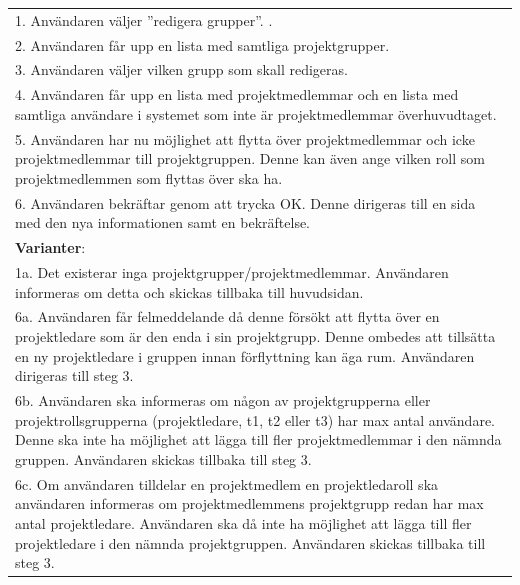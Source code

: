 \documentclass[a4paper]{article}
\begin{document}
\begin{table}[H]
\begin{tabular}{ | p{2cm} p{11cm} | }
	\multicolumn{2}{|p{13cm}|}{1. Användaren väljer ''redigera grupper''. .}\\
	\multicolumn{2}{|p{13cm}|}{2. Användaren får upp en lista med samtliga projektgrupper.}\\
	\multicolumn{2}{|p{13cm}|}{3. Användaren väljer vilken grupp som skall redigeras.} \\	
	\multicolumn{2}{|p{13cm}|}{4. Användaren får upp en lista med projektmedlemmar och en lista med samtliga användare i systemet som inte är projektmedlemmar överhuvudtaget.} \\	
	\multicolumn{2}{|p{13cm}|}{5. Användaren har nu möjlighet att flytta över projektmedlemmar och icke projektmedlemmar till projektgruppen. Denne kan även ange vilken roll som projektmedlemmen som flyttas över ska ha.} \\	
	\multicolumn{2}{|p{13cm}|}{6. Användaren bekräftar genom att trycka OK. Denne dirigeras till en sida med den nya informationen samt en bekräftelse.} \\
	\hline
    \multicolumn{2}{|p{13cm}|}{\textbf{Varianter}: }\\
    \multicolumn{2}{|p{13cm}|}{1a. Det existerar inga projektgrupper/projektmedlemmar. Användaren informeras om detta och skickas tillbaka till huvudsidan.}\\
    \multicolumn{2}{|p{13cm}|}{6a. Användaren får felmeddelande då denne försökt att flytta över en projektledare som är den enda i sin projektgrupp. Denne ombedes att tillsätta en ny projektledare i gruppen innan förflyttning kan äga rum. Användaren dirigeras till steg 3.} \\
    \multicolumn{2}{|p{13cm}|}{6b. Användaren ska informeras om någon av projektgrupperna eller projektrollsgrupperna (projektledare, t1, t2 eller t3) har max antal användare. Denne ska inte ha möjlighet att lägga till fler projektmedlemmar i den nämnda gruppen. Användaren skickas tillbaka till steg 3.}\\
    \multicolumn{2}{|p{13cm}|}{6c. Om användaren tilldelar en projektmedlem en projektledaroll ska användaren informeras om projektmedlemmens projektgrupp redan har max antal projektledare. Användaren ska då inte ha möjlighet att lägga till fler projektledare i den nämnda projektgruppen. Användaren skickas tillbaka till steg 3.}\\

    \hline
\end{tabular}
\end{table}

\end{document}
